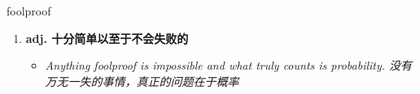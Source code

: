
\begin{frame}
{\huge foolproof}
\begin{center}
\begin{enumerate}\Large
  \item \textbf{adj. 十分简单以至于不会失败的}
  \begin{itemize}
    \item \em{\Large{Anything foolproof is impossible and what truly counts is probability. 没有万无一失的事情，真正的问题在于概率}}
  \end{itemize}
\end{enumerate}
\end{center}
\end{frame}
